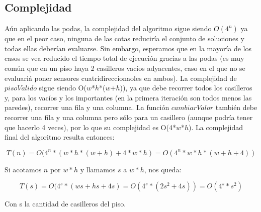 \subsection{Complejidad}
\par{A\'un aplicando las podas, la complejidad del algoritmo sigue siendo $O(4^{n})$ ya que en el peor caso, ninguna de las cotas reducir\'ia el conjunto de soluciones y todas ellas deber\'ian evaluarse. Sin embargo, esperamos que en la mayor\'ia de los casos se vea reducido el tiempo total de ejecuci\'on gracias a las podas (es muy com\'un que en un piso haya 2 casilleros vac\'ios adyacentes, caso en el que no se evaluari\'a poner sensores cuatridireccionaoles en ambos). La complejidad de $pisoValido$ sigue siendo O($w$*$h$*($w$+$h$)), ya que debe recorrer todos los casilleros y, para los vac\'ios y los importantes (en la primera iteraci\'on son todos menos las paredes), recorrer una fila y una columna. La funci\'on $cambiarValor$ tambi\'en debe recorrer una fila y una columna pero s\'olo para un casillero (aunque podr\'ia tener que hacerlo 4 veces), por lo que su complejidad es O(4*$w$*$h$). La complejidad final del algoritmo resulta entonces:

\begin{equation}
T(n) = O(4^n*(w*h*(w+h)+4*w*h) = O(4^n*w*h*(w+h+4)) 
\end{equation}

Si acotamos $n$ por $w*h$ y llamamos $s$ a $w*h$, nos queda:

\begin{equation}
T(s) = O(4^s*(ws+hs+4s) = O(4^s*(2s^2+4s)) = O(4^s*s^2)
\end{equation}

Con s la cantidad de casilleros del piso.

}
